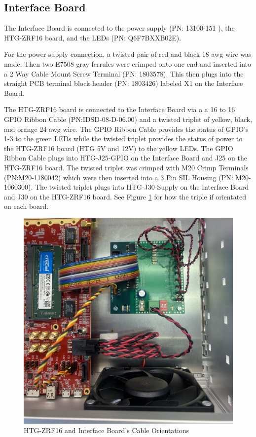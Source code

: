 \documentclass[12pt,a4paper,oneside]{article}
\begin{document}
\subsection{Interface Board}
\label{sec:6.2}

The Interface Board is connected to the power supply (PN: 13100-151 ), the HTG-ZRF16 board, and the LEDs (PN: Q6F7BXXB02E).

For the power supply connection, a twisted pair of red and black 18 awg wire was made. Then two E7508 gray ferrules were crimped onto one end and inserted into a 2 Way Cable Mount Screw Terminal (PN: 1803578). This then plugs into the straight PCB terminal block header (PN: 1803426) labeled X1 on the Interface Board.  

The HTG-ZRF16 board is connected to the Interface Board via a a 16 to 16 GPIO Ribbon Cable (PN:IDSD-08-D-06.00) and a twisted triplet of yellow, black, and orange 24 awg wire. The GPIO Ribbon Cable provides the status of GPIO's 1-3 to the green LEDs while the twisted triplet provides the status of power to the HTG-ZRF16 board (HTG 5V and 12V) to the yellow LEDs. The GPIO Ribbon Cable plugs into HTG-J25-GPIO on the Interface Board and J25 on the HTG-ZRF16 board. The twisted triplet was crimped with M20 Crimp Terminals (PN:M20-1180042) which were then inserted into a 3 Pin SIL Housing (PN: M20-1060300). The twisted triplet plugs into HTG-J30-Supply on the Interface Board and J30 on the HTG-ZRF16 board. See Figure \ref{fig:power_indicator_cable} for how the triple if orientated on each board. 

\begin{figure}[H]
\centering
\includegraphics[width=1\linewidth]{figures/Power_indicator_cable.jpeg}
\caption{HTG-ZRF16 and Interface Board's Cable Orientations}
\label{fig:power_indicator_cable}
\end{figure}
\end{document}
